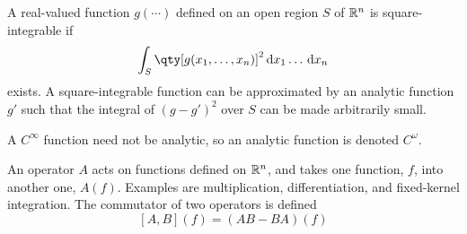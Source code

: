 A real-valued function $g(\cdots)$ defined on an open region $S$ of $\mathbb{R}^n$ is square-integrable if 
\begin{equation}
  \label{eq:3}
  \int_S \qty[ g(x_1, \dots, x_n)]^2 \dd{x_1 \dots \dd{x_n}}
\end{equation}
exists. A square-integrable function can be approximated by an analytic function $g'$ such that the integral of $(g - g')^2$ over $S$ can be made arbitrarily small.

A $C^{\infty}$ function need not be analytic, so an analytic function
is denoted $C^{\omega}$.

An operator $A$ acts on functions defined on $\mathbb{R}^n$, and takes one function, $f$, into another one, $A(f)$. Examples are multiplication, differentiation, and fixed-kernel integration.
The commutator of two operators is defined
\begin{equation}
  \label{eq:4}
  [A,B](f) = (AB-BA)(f)
\end{equation}

